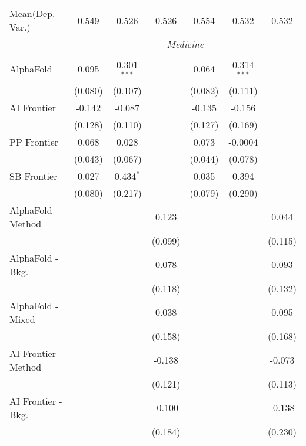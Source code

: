 \begin{tabular}{lcccccc}
Mean(Dep. Var.) & 0.549 & 0.526 & 0.526 & 0.554 & 0.532 & 0.532 \\
 & \multicolumn{6}{c}{\textit{Medicine}} \\ \\
   AlphaFold            & 0.095   & 0.301$^{***}$ &         & 0.064   & 0.314$^{***}$ &   \\   
                        & (0.080) & (0.107)       &         & (0.082) & (0.111)       &   \\   
   AI Frontier          & -0.142  & -0.087        &         & -0.135  & -0.156        &   \\   
                        & (0.128) & (0.110)       &         & (0.127) & (0.169)       &   \\   
   PP Frontier          & 0.068   & 0.028         &         & 0.073   & -0.0004       &   \\   
                        & (0.043) & (0.067)       &         & (0.044) & (0.078)       &   \\   
   SB Frontier          & 0.027   & 0.434$^{*}$   &         & 0.035   & 0.394         &   \\   
                        & (0.080) & (0.217)       &         & (0.079) & (0.290)       &   \\   
   AlphaFold - Method   &         &               & 0.123   &         &               & 0.044\\   
                        &         &               & (0.099) &         &               & (0.115)\\   
   AlphaFold - Bkg.     &         &               & 0.078   &         &               & 0.093\\   
                        &         &               & (0.118) &         &               & (0.132)\\   
   AlphaFold - Mixed    &         &               & 0.038   &         &               & 0.095\\   
                        &         &               & (0.158) &         &               & (0.168)\\   
   AI Frontier - Method &         &               & -0.138  &         &               & -0.073\\   
                        &         &               & (0.121) &         &               & (0.113)\\   
   AI Frontier - Bkg.   &         &               & -0.100  &         &               & -0.138\\   
                        &         &               & (0.184) &         &               & (0.230)\\   

\end{tabular}
